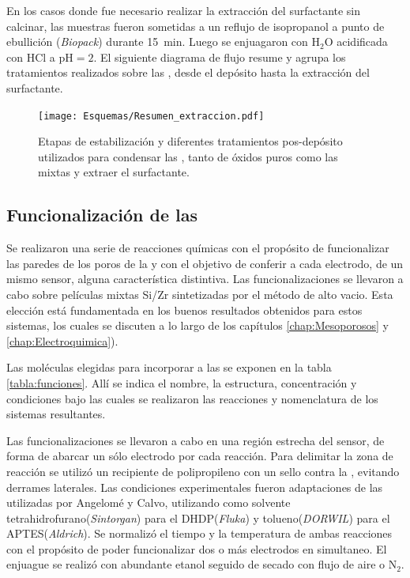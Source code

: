 		En los casos donde fue necesario realizar la extracción del surfactante sin calcinar, las muestras fueron sometidas a un reflujo de isopropanol a punto de ebullición (\textit{Biopack}) durante \SI{15}{\minute}. Luego se enjuagaron con H$_2$O acidificada con HCl a $\text{pH}=2$. El siguiente diagrama de flujo resume y agrupa los tratamientos realizados sobre las \pdm, desde el depósito hasta la extracción del surfactante.
		
				\begin{figure}[ht!]
						  \begin{center}
						  \texttt{[image: Esquemas/Resumen\_extraccion.pdf]}
						  \caption[Tratamientos pos-depósito de \pdm]{Etapas de estabilización y diferentes tratamientos pos-depósito utilizados para condensar las \pdm\space, tanto de óxidos puros como las mixtas y extraer el surfactante.}
						  \label{esq:peliculas_meso_tratamientos}
						  \end{center}
						  \end{figure}
    \vspace*{-0.3cm}
	\subsection{Funcionalización de las \pdm}
	
		Se realizaron una serie de reacciones químicas con el propósito de funcionalizar las paredes de los poros de la \pdm\space y con el objetivo de conferir a cada electrodo, de un mismo sensor, alguna característica distintiva. Las funcionalizaciones se llevaron a cabo sobre películas mixtas Si/Zr sintetizadas por el método de alto vacio. Esta elección está fundamentada en los buenos resultados obtenidos para estos sistemas, los cuales se discuten a lo largo de los capítulos \ref{chap:Mesoporosos} y \ref{chap:Electroquimica}).

		Las moléculas elegidas para incorporar a las \pdmZ\space se exponen en la tabla \ref{tabla:funciones}. Allí se indica el nombre, la estructura, concentración y condiciones bajo las cuales se realizaron las reacciones y nomenclatura de los sistemas resultantes.

		Las funcionalizaciones se llevaron a cabo en una región estrecha del sensor, de forma de abarcar un sólo electrodo por cada reacción. Para delimitar la zona de reacción se utilizó un recipiente de polipropileno con un sello contra la \pdm, evitando derrames laterales. Las condiciones experimentales fueron adaptaciones de las utilizadas por Angelomé\cite{Angelome2008} y Calvo\cite{Calvo20210}, utilizando como solvente tetrahidrofurano(\textit{Sintorgan}) para el DHDP(\textit{Fluka}) y tolueno(\textit{DORWIL}) para el APTES(\textit{Aldrich}). Se normalizó el tiempo y la temperatura de ambas reacciones con el propósito de poder funcionalizar dos o más electrodos en simultaneo. El enjuague se realizó con abundante etanol seguido de secado con flujo de aire o N$_2$.


